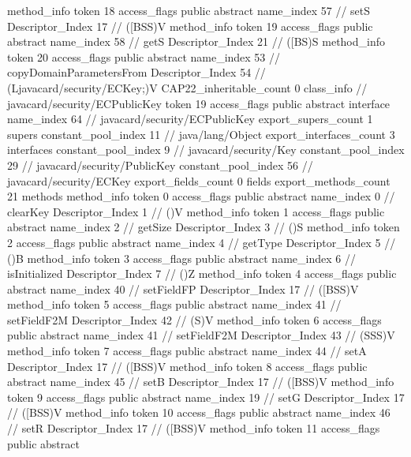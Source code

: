 {{{{				method_info {
					token	18
					access_flags	public abstract
					name_index	57		// setS
					Descriptor_Index	17		// ([BSS)V
				}
				method_info {
					token	19
					access_flags	public abstract
					name_index	58		// getS
					Descriptor_Index	21		// ([BS)S
				}
				method_info {
					token	20
					access_flags	public abstract
					name_index	53		// copyDomainParametersFrom
					Descriptor_Index	54		// (Ljavacard/security/ECKey;)V
				}
			}
			CAP22_inheritable_count	0
		}
		class_info {		// javacard/security/ECPublicKey
			token	19
			access_flags	public abstract interface
			name_index	64		// javacard/security/ECPublicKey
			export_supers_count	1
			supers {
				constant_pool_index	11		// java/lang/Object
			}
			export_interfaces_count	3
			interfaces {
				constant_pool_index	9		// javacard/security/Key
				constant_pool_index	29		// javacard/security/PublicKey
				constant_pool_index	56		// javacard/security/ECKey
			}
			export_fields_count	0
			fields {
			}
			export_methods_count	21
			methods {
				method_info {
					token	0
					access_flags	public abstract
					name_index	0		// clearKey
					Descriptor_Index	1		// ()V
				}
				method_info {
					token	1
					access_flags	public abstract
					name_index	2		// getSize
					Descriptor_Index	3		// ()S
				}
				method_info {
					token	2
					access_flags	public abstract
					name_index	4		// getType
					Descriptor_Index	5		// ()B
				}
				method_info {
					token	3
					access_flags	public abstract
					name_index	6		// isInitialized
					Descriptor_Index	7		// ()Z
				}
				method_info {
					token	4
					access_flags	public abstract
					name_index	40		// setFieldFP
					Descriptor_Index	17		// ([BSS)V
				}
				method_info {
					token	5
					access_flags	public abstract
					name_index	41		// setFieldF2M
					Descriptor_Index	42		// (S)V
				}
				method_info {
					token	6
					access_flags	public abstract
					name_index	41		// setFieldF2M
					Descriptor_Index	43		// (SSS)V
				}
				method_info {
					token	7
					access_flags	public abstract
					name_index	44		// setA
					Descriptor_Index	17		// ([BSS)V
				}
				method_info {
					token	8
					access_flags	public abstract
					name_index	45		// setB
					Descriptor_Index	17		// ([BSS)V
				}
				method_info {
					token	9
					access_flags	public abstract
					name_index	19		// setG
					Descriptor_Index	17		// ([BSS)V
				}
				method_info {
					token	10
					access_flags	public abstract
					name_index	46		// setR
					Descriptor_Index	17		// ([BSS)V
				}
				method_info {
					token	11
					access_flags	public abstract
}}}}}
